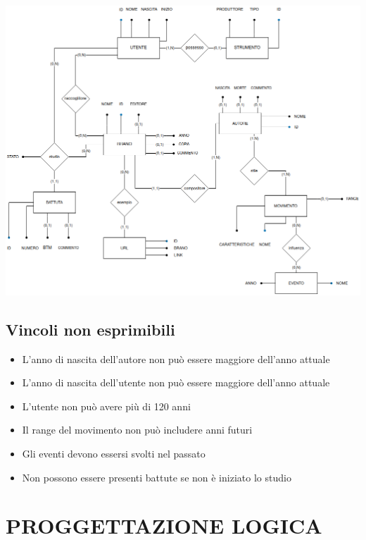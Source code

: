 \documentclass{article}
\begin{document}
    \begin{center}
        \includegraphics[width=\linewidth]{immagini/01_diagrammaER.png}   %
    \end{center}

    \subsection{Vincoli non esprimibili}

    \begin{itemize}
        \item L'anno di nascita dell'autore non può essere maggiore dell'anno attuale
        \item L'anno di nascita dell'utente non può essere maggiore dell'anno attuale
        \item L'utente non può avere più di 120 anni
        \item Il range del movimento non può includere anni futuri
        \item Gli eventi devono essersi svolti nel passato
        \item Non possono essere presenti battute se non è iniziato lo studio
    \end{itemize}

    \section{PROGGETTAZIONE LOGICA}
\end{document}
